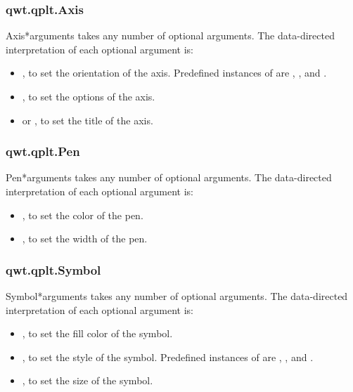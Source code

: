 \documentclass{manual}
\begin{document}
\subsubsection{qwt.qplt.Axis \label{intro-qplt-axis}}

\begin{classdesc}{Axis}{*arguments}
   takes any number of optional arguments.
  The data-directed interpretation of each optional argument is:
  \begin{itemize}
  \item
    , to set the orientation of the axis.  Predefined
    instances of  are , ,
     and .
  \item
    , to set the options of the axis.
  \item
     or , to set the title of the axis.
  \end{itemize}
\end{classdesc}

\subsubsection{qwt.qplt.Pen \label{intro-qplt-pen}}

\begin{classdesc}{Pen}{*arguments}
   takes any number of optional arguments.
  The data-directed interpretation of each optional argument is:
  \begin{itemize}
  \item
    , to set the color of the pen.
  \item
    , to set the width of the pen.
  \end{itemize}
\end{classdesc}

\subsubsection{qwt.qplt.Symbol \label{intro-qplt-symbol}}

\begin{classdesc}{Symbol}{*arguments}
   takes any number of optional arguments.
  The data-directed interpretation of each optional argument is:
  \begin{itemize}
  \item
    , to set the fill color of the symbol.
  \item
    , to set the style of the symbol. Predefined instances
    of  are , ,
     and .
  \item
    , to set the size of the symbol.
  \end{itemize}
\end{classdesc}
\end{document}
